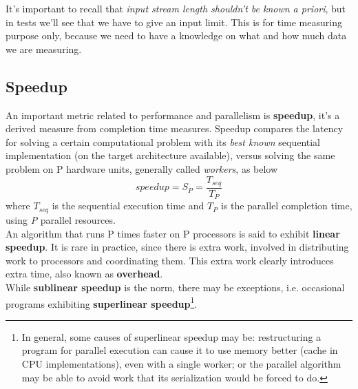 It's important to recall that \textit{input stream length shouldn't be known a priori}, but in tests we'll see that we have to give an input limit. This is for time measuring purpose only, because we need to have a knowledge on what and how much data we are measuring.


\subsection{Speedup}
\label{subs:speedup}
An important metric related to performance and parallelism is \textbf{speedup}, it's a derived measure from completion time measures. Speedup compares the latency for solving a certain computational problem with its \textit{best known} sequential implementation (on the target architecture available), versus solving the same problem on P hardware units, generally called \textit{workers}, as below
\begin{equation}\label{eq:speedup}
	speedup = S_{P} = \frac{T_{seq}}{T_{P}} 
\end{equation}
where \(T_{seq}\) is the sequential execution time and \(T_{P}\) is the parallel completion time, using \textit{P} parallel resources\cite{spm}.\\
An algorithm that runs P times faster on P processors is said to exhibit \textbf{linear speedup}. It is rare in practice, since there is extra work, involved in distributing work to processors and coordinating them. This extra work clearly introduces extra time, also known as \textbf{overhead}.\\
While \textbf{sublinear speedup} is the norm, there may be exceptions, i.e. occasional programs exhibiting \textbf{superlinear speedup}\footnote{In general, some causes of superlinear speedup may be: restructuring a program for parallel execution can cause it to use memory better (cache in CPU implementations), even with a single worker; or the parallel algorithm  may be able to avoid work that its serialization would be forced to do.}\cite{structparprog}.\\%


